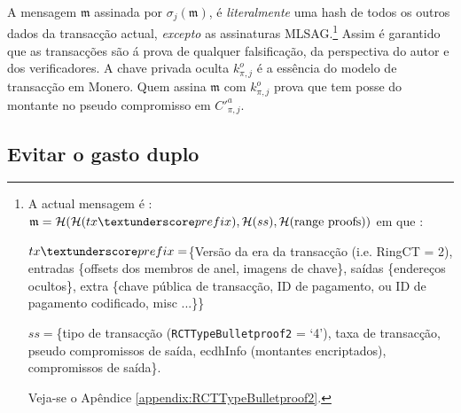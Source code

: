 
A mensagem $\mathfrak{m}$ assinada por $\sigma_j(\mathfrak{m})$, é {\em literalmente} uma hash de todos os outros dados da transacção actual, {\em excepto} as assinaturas MLSAG.\footnote{A actual mensagem é :$\mathfrak{m} = \mathcal{H}(\mathcal{H}(tx\textunderscore prefix),\mathcal{H}(ss),\mathcal{H}(\text{range proofs}))$ em que :\par
$tx\textunderscore prefix = $\{Versão da era da transacção (i.e. RingCT = 2), entradas \{offsets dos membros de anel, imagens de chave\}, saídas \{endereços ocultos\}, extra \{chave pública de transacção, ID de pagamento, ou ID de pagamento codificado, misc ...\}\}\par
$ss = $\{tipo de transacção ({\tt RCTTypeBulletproof2} = `4'), taxa de transacção, pseudo compromissos de saída, ecdhInfo (montantes encriptados), compromissos de saída\}.\par
Veja-se o Apêndice \ref{appendix:RCTTypeBulletproof2}.} 
Assim é garantido que as transacções são á prova de qualquer falsificação, da perspectiva do autor e dos verificadores.
A chave privada oculta $k^o_{\pi,j}$ é a essência do modelo de transacção em Monero. Quem assina $\mathfrak{m}$ com $k^o_{\pi,j}$ prova que tem posse do montante no pseudo compromisso em $C'^a_{\pi, j}$.
\subsection{Evitar o gasto duplo}

